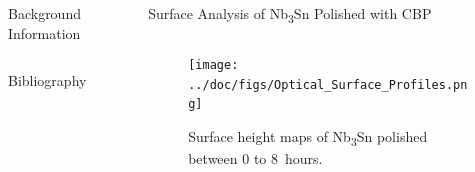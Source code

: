\documentclass{beamer}
\begin{document}
\begin{frame}{}
\begin{columns}[t]
\begin{column}{0.32\linewidth}
\begin{block}{\label{sec:backgroundinformation}Background Information}
\begin{columns}[t]
\begin{column}{0.45\columnwidth}
                        \end{column}
                    \end{columns}
                \end{block}
                \begin{block}{\label{sec:bibliography}Bibliography}
                    \small
                    
                    
                \end{block}
            \end{column}





            \begin{column}{0.32\linewidth}    
                \begin{block}{\label{sec:samplestudy}Surface Analysis of Nb\textsubscript{3}Sn Polished with CBP}
                    \begin{columns}[t]
                        \begin{column}{0.42\columnwidth}
                            \begin{figure}[t]
                                \centering
                                \texttt{[image: ../doc/figs/Optical\_Surface\_Profiles.png]}
                                \caption{\label{fig:opticalsurfaceprofiles}Surface height maps of Nb\textsubscript{3}Sn polished between 0 to 8~hours.}
                            \end{figure}


\end{column}
\end{columns}
\end{block}
\end{column}
\end{columns}
\end{frame}
\end{document}

